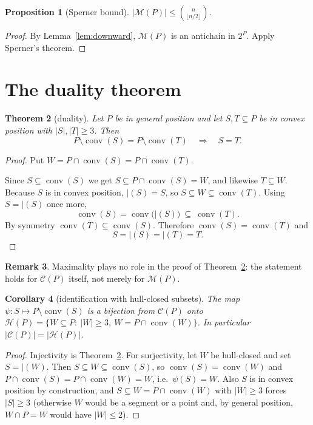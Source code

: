 \documentclass[11pt,a4paper]{article}
\newtheorem{theorem}{Theorem}[section]
\newtheorem{proposition}[theorem]{Proposition}
\newtheorem{corollary}[theorem]{Corollary}
\theoremstyle{definition}
\newtheorem{remark}[theorem]{Remark}
\newcommand{\conv}{\operatorname{conv}}
\newcommand{\M}{\mathcal{M}}
\newcommand{\CP}{\mathcal{C}}
\newcommand{\HP}{\mathcal{H}}
\begin{document}
\begin{proposition}[Sperner bound]
\label{prop:sperner}
$|\M(P)|\le\binom{n}{\lfloor n/2\rfloor}$.
\end{proposition}

\begin{proof}
By Lemma~\ref{lem:downward}, $\M(P)$ is an antichain in $2^P$.  Apply Sperner's
theorem.
\end{proof}

\section{The duality theorem}
\label{sec:duality}

\begin{theorem}[duality]
\label{thm:duality}
Let $P$ be in general position and let $S,T\subseteq P$ be in convex position
with $|S|,|T|\ge 3$.  Then
\[
  P\setminus\conv(S)=P\setminus\conv(T)\quad\Longrightarrow\quad S=T.
\]
\end{theorem}

\begin{proof}
Put $W=P\cap\conv(S)=P\cap\conv(T)$.

Since $S\subseteq\conv(S)$ we get $S\subseteq P\cap\conv(S)=W$, and likewise
$T\subseteq W$.  Because $S$ is in convex position, $\vert(S)=S$, so
$S\subseteq W\subseteq\conv(T)$.  Using $S=\vert(S)$ once more,
\[
  \conv(S)=\conv\bigl(\vert(S)\bigr)\ \subseteq\ \conv(T).
\]
By symmetry $\conv(T)\subseteq\conv(S)$.  Therefore $\conv(S)=\conv(T)$ and
\[
  S=\vert(S)=\vert(T)=T.
\]
\end{proof}

\begin{remark}
Maximality plays no role in the proof of Theorem~\ref{thm:duality}: the statement
holds for $\CP(P)$ itself, not merely for $\M(P)$.
\end{remark}

\begin{corollary}[identification with hull-closed subsets]
\label{cor:bijection}
The map $\psi:S\mapsto P\setminus\conv(S)$ is a bijection from $\CP(P)$ onto
$\HP(P)=\{W\subseteq P:\ |W|\ge 3,\ W=P\cap\conv(W)\}$.  In particular
$|\CP(P)|=|\HP(P)|$.
\end{corollary}

\begin{proof}
Injectivity is Theorem~\ref{thm:duality}.  For surjectivity, let $W$ be
hull-closed and set $S=\vert(W)$.  Then $S\subseteq W\subseteq\conv(S)$, so
$\conv(S)=\conv(W)$ and
$P\cap\conv(S)=P\cap\conv(W)=W$, i.e.\ $\psi(S)=W$.  Also $S$ is in convex
position by construction, and $S\subseteq W=P\cap\conv(W)$ with
$|W|\ge 3$ forces $|S|\ge 3$ (otherwise $W$ would be a segment or a point and,
by general position, $W\cap P=W$ would have $|W|\le 2$).
\end{proof}
\end{document}
